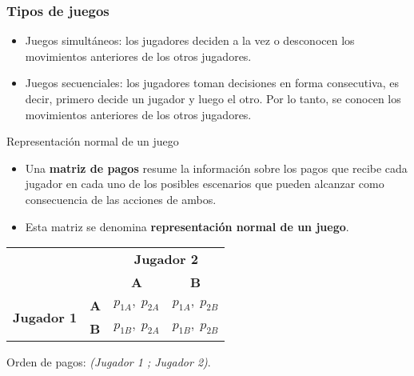 \documentclass{beamer}
\begin{document}
\begin{frame}
    \frametitle{Tipos de juegos}
    \begin{itemize}
        \item Juegos simultáneos: los jugadores deciden a la vez o desconocen los movimientos anteriores de los otros jugadores.
        \vspace{1mm} 
        \item Juegos secuenciales: los jugadores toman decisiones en forma consecutiva, es decir, primero decide un jugador y luego el otro. Por lo tanto, se conocen los movimientos anteriores de los otros jugadores. 
    \end{itemize}
\end{frame}

\begin{frame}{Representación normal de un juego}

\begin{itemize}
    \item Una \textbf{matriz de pagos} resume la información sobre los pagos que recibe cada jugador en cada uno de los posibles escenarios que pueden alcanzar como consecuencia de las acciones de ambos. 
    \item Esta matriz se denomina \textbf{representación normal de un juego}. \vspace{4mm}
 \end{itemize}
\centering
\setlength{\tabcolsep}{16pt}
\renewcommand{\arraystretch}{1.6}

\begin{tabular}{@{} l l | c c @{}}
\multicolumn{2}{c}{} & \multicolumn{2}{c}{\textbf{Jugador 2}} \\
\multicolumn{2}{c}{} & \textbf{A} & \textbf{B} \\
\midrule
\multirow{2}{*}{\textbf{Jugador 1}} 
  & \textbf{A} & $p_{1A}, \; p_{2A}$ & $p_{1A}, \; p_{2B}$ \\
  & \textbf{B} & $p_{1B}, \; p_{2A}$ & $p_{1B}, \; p_{2B}$ \\ \midrule
\end{tabular}

\vspace{4mm}

\small Orden de pagos: \textit{(Jugador 1 ; Jugador 2)}.
\end{frame}
\end{document}
